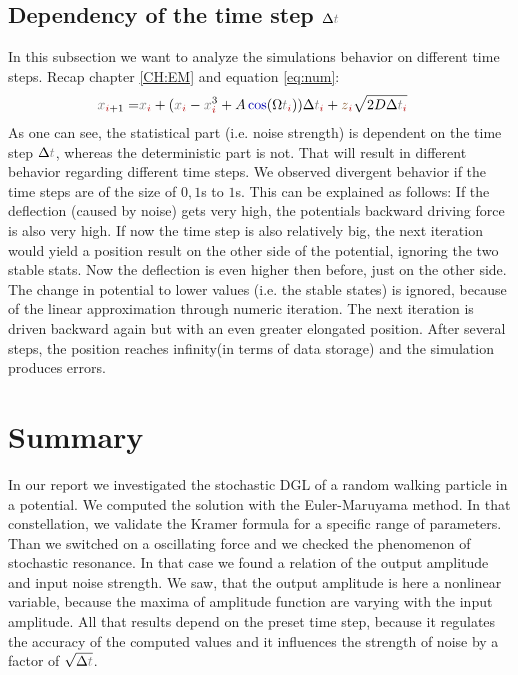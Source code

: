 \documentclass[10pt,fleqn,%
reqno,a4paper]{article}
\makeatletter
\def\mathcolor#1#{\@mathcolor{#1}}
\def\@mathcolor#1#2#3{%
        \protect\leavevmode
        \begingroup\color#1{#2}#3\endgroup
}
\newcommand{\nx}{\mathcolor{gray}{x}}
\newcommand{\nt}{\mathcolor{gray}{t}}
\newcommand{\ncos}{\mathcolor{blue!70!black}{\cos}}
\newcommand{\nni}{\mathcolor{red!70!black}{i}}
\newcommand{\nz}{\mathcolor{brown!70!black}{z}}
\makeatother
\begin{document}
\newpage
\subsection{Dependency of the time step $ \Delta \nt $}
In this subsection we want to analyze  the simulations behavior on different time steps.
Recap chapter \ref{CH:EM} and equation \ref{eq:num}:
\begin{align*}
	\nx _{\nni+1}=& \nx _{\nni} + (\nx_{\nni}-\nx _{\nni} ^3  + A\ncos (\Omega \nt _{\nni}) )\Delta \nt_{\nni} + \nz_{\nni} \sqrt{2D \Delta \nt_{\nni}}
\end{align*}
As one can see, the statistical part (i.e. noise strength) is dependent on the time step $\Delta \nt$, whereas the deterministic part is not. That will result in different behavior regarding different time steps.
We observed divergent behavior if the time steps are of the size of $0,1$s to $1$s. This can be explained as follows: If the deflection (caused by noise) gets very high, the potentials backward driving force is also very high. If now the time step is also relatively big, the next iteration would yield a position result on the other side of the potential, ignoring the two stable stats. Now the deflection is even higher then before, just on the other side. The change in potential to lower values (i.e. the stable states) is ignored, because of the linear approximation through numeric iteration.
The next iteration is driven backward again but with an even greater elongated position. After several steps, the position reaches infinity(in terms of data storage) and the simulation produces errors.

 

\newpage

\section{Summary}
In our report we investigated the stochastic DGL of a random walking particle in a potential. We computed the solution with the Euler-Maruyama method. In that constellation, we validate the Kramer formula for a specific range of parameters. Than we switched on a oscillating force and we checked the phenomenon of stochastic resonance. In that case we found a relation of the output amplitude and input noise strength. We saw, that the output amplitude is here a nonlinear variable, because the maxima of amplitude function are varying with the input amplitude. All that results depend on the preset time step, because it regulates the accuracy of the computed values and it influences the strength of noise by a factor of $ \sqrt{\Delta \nt} $.  
\end{document}
